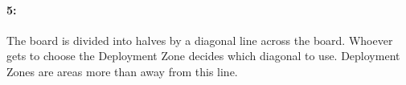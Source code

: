 \begin{minipage}{0.67\textwidth}
\hypertarget{refused_flank}{\paragraph{5\spacebeforecolon{}: }}
\vspace*{0.5ex}

The board is divided into halves by a diagonal line across the board. Whoever gets to choose the Deployment Zone decides which diagonal to use. Deployment Zones are areas more than  away from this line.
\end{minipage}\hfill\begin{minipage}{0.275\textwidth}
\def\svgwidth{\textwidth}

\end{minipage}\hspace*{0.022\textwidth}

